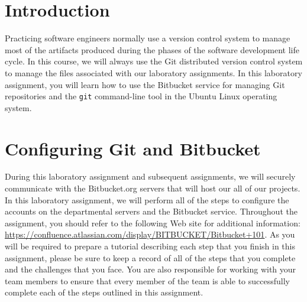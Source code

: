 

\usepackage[compact]{titlesec}



\section*{Introduction}

Practicing software engineers normally use a version control system to manage most of the artifacts produced during the
phases of the software development life cycle.  In this course, we will always use the Git distributed version control
system to manage the files associated with our laboratory assignments.  In this laboratory assignment, you will learn
how to use the Bitbucket service for managing Git repositories and the {\tt git} command-line tool in the Ubuntu Linux
operating system.

\section*{Configuring Git and Bitbucket}

During this laboratory assignment and subsequent assignments, we will securely communicate with the Bitbucket.org
servers that will host our all of our projects.  In this laboratory assignment, we will perform all of the steps to
configure the accounts on the departmental servers and the Bitbucket service.  Throughout the assignment, you should
refer to the following Web site for additional information:
\url{https://confluence.atlassian.com/display/BITBUCKET/Bitbucket+101}.  As you will be required to prepare a tutorial
describing each step that you finish in this assignment, please be sure to keep a record of all of the steps that you
complete and the challenges that you face.  You are also responsible for working with your team members to ensure that
every member of the team is able to successfully complete each of the steps outlined in this assignment.


